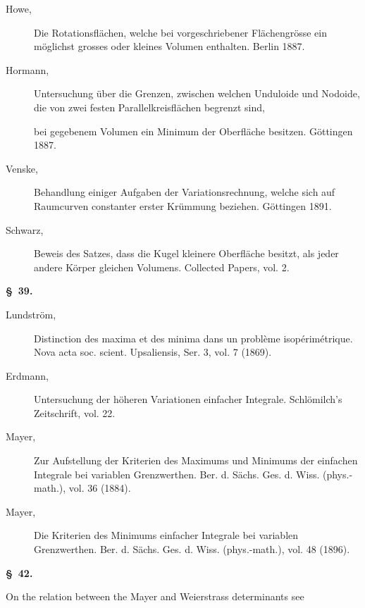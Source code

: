 \documentclass[11pt,a4paper,leqno]{article}
\begin{document}
\begin{description}
\item[Howe,] Die Rotationsflächen, welche bei vorgeschriebener Flächengrösse
ein möglichst grosses oder kleines Volumen enthalten. Berlin 1887.

\item[Hormann,] Untersuchung über die Grenzen, zwischen welchen Unduloide und
Nodoide, die von zwei festen Parallelkreisflächen begrenzt sind,

bei gegebenem Volumen ein Minimum der Oberfläche besitzen. Göttingen 1887.

\item[Venske,] Behandlung einiger Aufgaben der Variationsrechnung, welche sich
auf Raumcurven constanter erster Krümmung beziehen. Göttingen 1891.

\item[Schwarz,] Beweis des Satzes, dass die Kugel kleinere Oberfläche besitzt,
als jeder andere Körper gleichen Volumens. Collected Papers, vol. 2.
\end{description}

\begin{center}{\bfseries \S~39.}\end{center}

\begin{description}
\item[Lundström,] Distinction des maxima et des minima dans un problème
isopérimétrique. Nova acta soc. scient. Upsaliensis, Ser. 3, vol. 7 (1869).

\item[Erdmann,] Untersuchung der höheren Variationen einfacher Integrale.
Schlömilch's Zeitschrift, vol. 22.

\item[Mayer,] Zur Aufstellung der Kriterien des Maximums und Minimums der
einfachen Integrale bei variablen Grenzwerthen. Ber. d. Sächs. Ges. d. Wiss.
(phys.-math.), vol. 36 (1884).

\item[Mayer,] Die Kriterien des Minimums einfacher Integrale bei variablen
Grenzwerthen. Ber. d. Sächs. Ges. d. Wiss. (phys.-math.), vol. 48 (1896).
\end{description}

\begin{center}{\bfseries \S~42.}\end{center}

\noindent On the relation between the Mayer and Weierstrass determinants see
\end{document}
